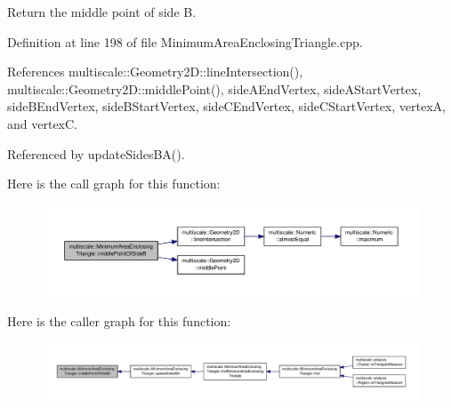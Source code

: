 Return the middle point of side B. 



Definition at line 198 of file Minimum\-Area\-Enclosing\-Triangle.\-cpp.



References multiscale\-::\-Geometry2\-D\-::line\-Intersection(), multiscale\-::\-Geometry2\-D\-::middle\-Point(), side\-A\-End\-Vertex, side\-A\-Start\-Vertex, side\-B\-End\-Vertex, side\-B\-Start\-Vertex, side\-C\-End\-Vertex, side\-C\-Start\-Vertex, vertex\-A, and vertex\-C.



Referenced by update\-Sides\-B\-A().



Here is the call graph for this function\-:\nopagebreak
\begin{figure}[H]
\begin{center}
\leavevmode
\includegraphics[width=350pt]{classmultiscale_1_1MinimumAreaEnclosingTriangle_aedcbb3708672759e60a547d0a5eb0ddd_cgraph}
\end{center}
\end{figure}




Here is the caller graph for this function\-:\nopagebreak
\begin{figure}[H]
\begin{center}
\leavevmode
\includegraphics[width=350pt]{classmultiscale_1_1MinimumAreaEnclosingTriangle_aedcbb3708672759e60a547d0a5eb0ddd_icgraph}
\end{center}
\end{figure}


